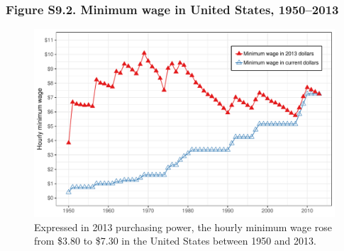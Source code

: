 \documentclass[t]{beamer}\usepackage[]{graphicx}\usepackage[]{color}
\makeatletter
\def\maxwidth{ %
  \ifdim\Gin@nat@width>\linewidth
    \linewidth
  \else
    \Gin@nat@width
  \fi
}
\newenvironment{knitrout}{}{} %
\makeatother
\begin{document}
\begin{frame}[label=Figure_S9_2]
\frametitle{Figure S9.2. Minimum wage in United States, 1950--2013}
\begin{figure}[t]
\begin{minipage}[b]{\textwidth}
\centering
\begin{knitrout}\footnotesize
{}\color{fgcolor}

{\centering \includegraphics[width=\maxwidth]{figures/color/Figure_S9_2} 

}



\end{knitrout}
\caption{Expressed in 2013 purchasing power, the hourly minimum wage rose from \$3.80 to \$7.30 in the United States between 1950 and 2013.}
\end{minipage}
\end{figure}
\end{frame}
\end{document}
